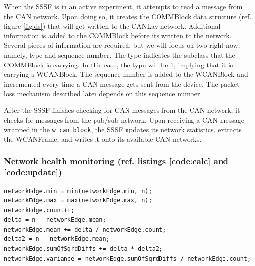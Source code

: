 \documentclass[letterpaper,twocolumn,12pt]{article}
\begin{document}
When the SSSF is in an active experiment, it attempts to read a message from the CAN network. Upon doing so, it creates the COMMBlock data structure (ref. figure \ref{fig:ds}) that will get written to the CANLay network. 
Additional information is added to the COMMBlock before its written to the network. Several pieces of information are required, but we will focus on two right now, namely, type and sequence number.
The type indicates the subclass that the COMMBlock is carrying. In this case, the type will be 1, implying that it is carrying a WCANBlock. 
The sequence number is added to the WCANBlock and incremented every time a CAN message gets sent from the device. 
The packet loss mechanism described later depends on this sequence number. 

After the SSSF finishes checking for CAN messages from the CAN network, it checks for messages from the pub/sub network.
Upon receiving a CAN message wrapped in the \texttt{w\_can\_block}, the SSSF updates its network statistics, extracts the WCANFrame, and writes it onto its available CAN networks.

\subsubsection{Network health monitoring (ref. listings \ref{code:calc} and \ref{code:update})}\label{sec:nethealth}

\begin{lstlisting}[caption={calculate\_health(HealthCore \&networkEdge, n)}, label=code:calc, float=t]
networkEdge.min = min(networkEdge.min, n);
networkEdge.max = max(networkEdge.max, n);
networkEdge.count++;
delta = n - networkEdge.mean;
networkEdge.mean += delta / networkEdge.count;
delta2 = n - networkEdge.mean;
networkEdge.sumOfSqrdDiffs += delta * delta2;
networkEdge.variance = networkEdge.sumOfSqrdDiffs / networkEdge.count;
\end{lstlisting}
\end{document}
